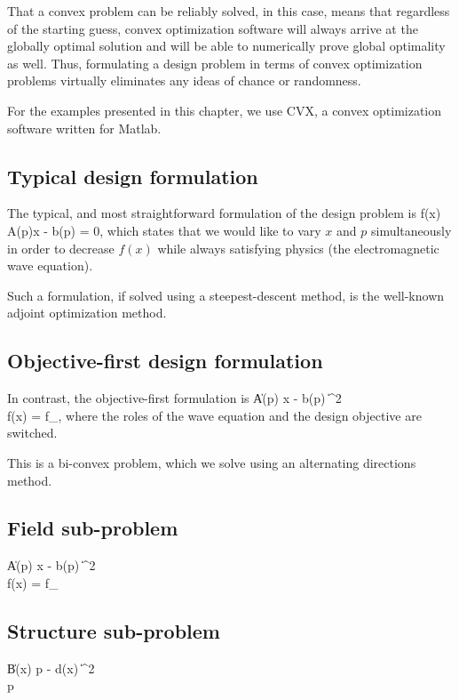 That a convex problem can be reliably solved, in this case, 
    means that regardless of the starting guess,
    convex optimization software will 
    always arrive at the globally optimal solution
    and will be able to numerically prove global optimality as well.
Thus, formulating a design problem in terms of convex optimization problems
    virtually eliminates any ideas of chance or randomness.

For the examples presented in this chapter,
    we use CVX, a convex optimization software written for Matlab. %


\subsection{Typical design formulation}
The typical, and most straightforward formulation
    of the design problem is
\BA {} f(x) \\
    \subto A(p)x - b(p) = 0, \label{eq:typ:eqcon} \EA
    which states that we would like to vary $x$ and $p$ simultaneously
    in order to decrease $f(x)$
    while always satisfying physics (the electromagnetic wave equation).

Such a formulation, if solved using a steepest-descent method,
    is the well-known adjoint optimization method. %

\subsection{Objective-first design formulation}
In contrast, the objective-first formulation is 
\BA {} \| A(p) x - b(p) \|^2 \\
    \subto f(x) = f_, \EA
    where the roles of the wave equation and the design objective are switched.


This is a bi-convex problem, which we solve using an alternating directions method.

\subsection{Field sub-problem}
\BA {} \| A(p) x - b(p) \|^2 \\
    \subto f(x) = f_ \EA

\subsection{Structure sub-problem}
\BA {} \| B(x) p - d(x) \|^2 \\
     \le p  \EA

